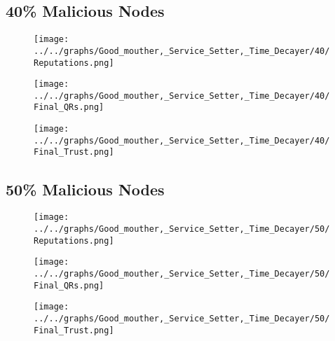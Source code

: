 \begin{minipage}[t]{0.49\columnwidth}
\subsection*{40\% Malicious Nodes}
    \begin{figure}[H]
        \centering
        \texttt{[image: ../../graphs/Good\_mouther,\_Service\_Setter,\_Time\_Decayer/40/Reputations.png]}
    \end{figure}
    \begin{figure}[H]
        \centering
        \texttt{[image: ../../graphs/Good\_mouther,\_Service\_Setter,\_Time\_Decayer/40/Final\_QRs.png]}
    \end{figure}
\end{minipage}
\begin{minipage}[t]{0.49\columnwidth}
    \begin{figure}[H]
        \centering
        \texttt{[image: ../../graphs/Good\_mouther,\_Service\_Setter,\_Time\_Decayer/40/Final\_Trust.png]}
    \end{figure}
\end{minipage}

\begin{minipage}[t]{0.49\columnwidth}
\subsection*{50\% Malicious Nodes}
    \begin{figure}[H]
        \centering
        \texttt{[image: ../../graphs/Good\_mouther,\_Service\_Setter,\_Time\_Decayer/50/Reputations.png]}
    \end{figure}
    \begin{figure}[H]
        \centering
        \texttt{[image: ../../graphs/Good\_mouther,\_Service\_Setter,\_Time\_Decayer/50/Final\_QRs.png]}
    \end{figure}
\end{minipage}
\begin{minipage}[t]{0.49\columnwidth}
    \begin{figure}[H]
        \centering
        \texttt{[image: ../../graphs/Good\_mouther,\_Service\_Setter,\_Time\_Decayer/50/Final\_Trust.png]}
    \end{figure}
\end{minipage}

